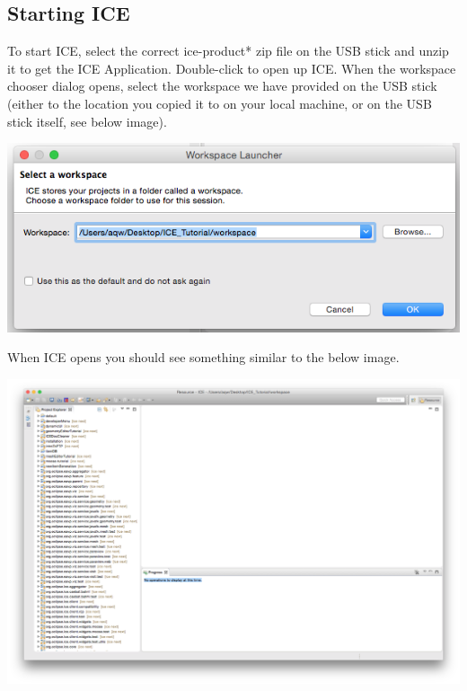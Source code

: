 \subsection*{Starting ICE}
To start ICE, select the correct ice-product* zip file on the USB stick and
unzip it to get the ICE Application. Double-click to open up ICE. When the workspace chooser
dialog opens, select the workspace we have provided on the USB stick (either to
the location you copied it to on your local machine, or on the USB stick
itself, see below image). 
\begin{center} \includegraphics[width=\textwidth]{figures/workspace}
\end{center}
When ICE opens you should see something similar to the below image. 
\begin{center} \includegraphics[width=\textwidth]{figures/expectedICE}
\end{center} 

